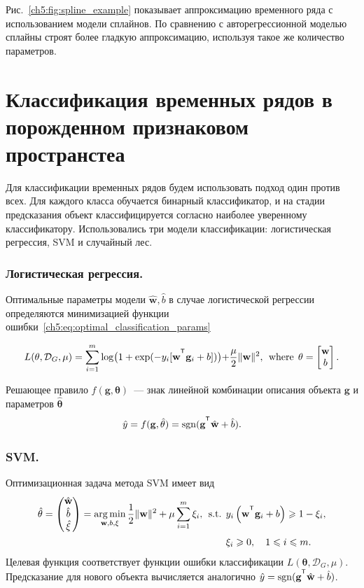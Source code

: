Рис.~\ref{ch5:fig:spline_example} показывает аппроксимацию временного ряда с использованием модели сплайнов.
По сравнению с авторегрессионной моделью сплайны строят более гладкую аппроксимацию, используя такое же количество параметров.

\section{Классификация временных рядов в порожденном признаковом пространстеа}
Для классификации временных рядов будем использовать подход один против всех. 
Для каждого класса обучается бинарный классификатор, и на стадии предсказания объект классифицируется согласно наиболее уверенному классификатору.
Использовались три модели классификации: логистическая регрессия, SVM и случайный лес.

\subsubsection{Логистическая регрессия.}
Оптимальные параметры модели $\hat{\mathbf{w}}, \hat{b}$  в случае логистической регрессии определяются минимизацией функции ошибки~\eqref{ch5:eq:optimal_classification_params}

\begin{equation*}
L(\mathbf{\theta}, \mathcal{D}_G, \mu) = \sum_{i=1}^{m} \log\bigl(1 + \exp(-y_i [\mathbf{w}^{\T} \mathbf{g}_i + b])\bigl) + \frac{\mu}{2} \|\mathbf{w}\|^2, \:\:\mbox{where}\:\: \mathbf{\theta}  = \begin{bmatrix}
\mathbf{w} \\ b
\end{bmatrix}.
\end{equation*}

Решающее правило $f(\mathbf{g}, \mathbf{\theta})$~--- знак линейной комбинации описания объекта $\mathbf{g}$ и параметров $\hat{\mathbf{\theta}}$
\begin{equation*}
\hat{y} = f(\mathbf{g}, \hat{\mathbf{\theta}}) = \sgn(\mathbf{g}^{\T} \hat{\mathbf{w}} + \hat{b}).
\end{equation*}

\subsubsection{SVM.}
Оптимизационная задача метода SVM имеет вид
\begin{align*}
\hat{\mathbf{\theta}}  = \begin{pmatrix}
\hat{\mathbf{w}} \\ \hat{b} \\ \hat{\mathbf{\xi}}
\end{pmatrix}= \argmin_{\mathbf{w}, b, \mathbf{\xi}}  \frac{1}{2} \|\mathbf{w}\|^2 + \mu \sum_{i=1}^{m} \xi_i,\:\:
\mbox{s.t.} \:\: &y_i \left(\mathbf{w}^{\T} \mathbf{g}_i + b\right) \geq 1 - \xi_i,\\
&\xi_i \geq 0, \quad 1 \leq i \leq m.
\end{align*}
Целевая функция соответствует функции ошибки классификации $L(\mathbf{\theta}, \mathcal{D}_G, \mu)$.
Предсказание для нового объекта вычисляется аналогично $
\hat{y} = \sgn (\mathbf{g}^{\T} \hat{\mathbf{w}} + \hat{b})$.

